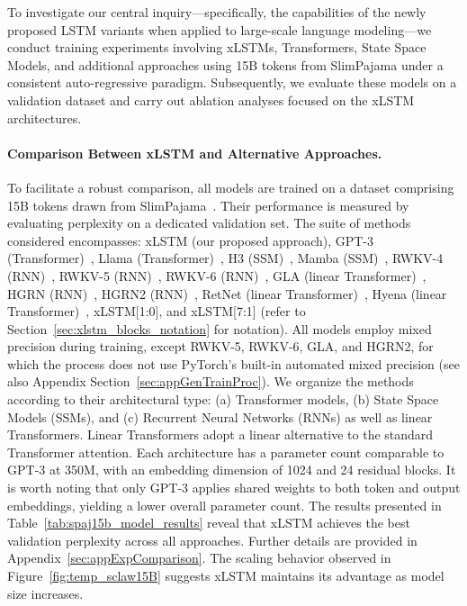 To investigate our central inquiry—specifically, the capabilities of the newly proposed LSTM variants when applied to large-scale language modeling—we conduct training experiments involving xLSTMs, Transformers, State Space Models, and additional approaches using 15B tokens from SlimPajama under a consistent auto-regressive paradigm. Subsequently, we evaluate these models on a validation dataset and carry out ablation analyses focused on the xLSTM architectures.

\paragraph{Comparison Between xLSTM and Alternative Approaches.} To facilitate a robust comparison, all models are trained on a dataset comprising 15B tokens drawn from SlimPajama~\citep{Soboleva:23}. Their performance is measured by evaluating perplexity on a dedicated validation set. The suite of methods considered encompasses: xLSTM (our proposed approach), GPT-3 (Transformer)~\citep{Brown:20short}, Llama (Transformer)~\citep{Touvron:23arxiv}, H3 (SSM)~\citep{Fu:23}, Mamba (SSM)~\citep{Gu:24arxiv}, RWKV-4 (RNN)~\citep{Peng:23arxivshort}, RWKV-5 (RNN)~\citep{Peng:24arxivshort}, RWKV-6 (RNN)~\citep{Peng:24arxivshort}, GLA (linear Transformer)~\citep{Yang:23arxiv}, HGRN (RNN)~\citep{Qin:23}, HGRN2 (RNN)~\citep{Qin:24arxiv}, RetNet (linear Transformer)~\citep{Sun:23arxiv}, Hyena (linear Transformer)~\citep{Poli:23}, xLSTM[1:0], and xLSTM[7:1] (refer to Section~\ref{sec:xlstm_blocks_notation} for notation). 
All models employ mixed precision during training, except RWKV-5, RWKV-6, GLA, and HGRN2, for which the process does not use PyTorch's built-in automated mixed precision (see also Appendix Section~\ref{sec:appGenTrainProc}).
We organize the methods according to their architectural type: (a) Transformer models, (b) State Space Models (SSMs), and (c) Recurrent Neural Networks (RNNs) as well as linear Transformers. Linear Transformers adopt a linear alternative to the standard Transformer attention. Each architecture has a parameter count comparable to GPT-3 at 350M, with an embedding dimension of 1024 and 24 residual blocks. It is worth noting that only GPT-3 applies shared weights to both token and output embeddings, yielding a lower overall parameter count. The results presented in Table~\ref{tab:spaj15b_model_results} reveal that xLSTM achieves the best validation perplexity across all approaches. Further details are provided in Appendix~\ref{sec:appExpComparison}.
The scaling behavior observed in Figure~\ref{fig:temp_sclaw15B} suggests xLSTM maintains its advantage as model size increases.

